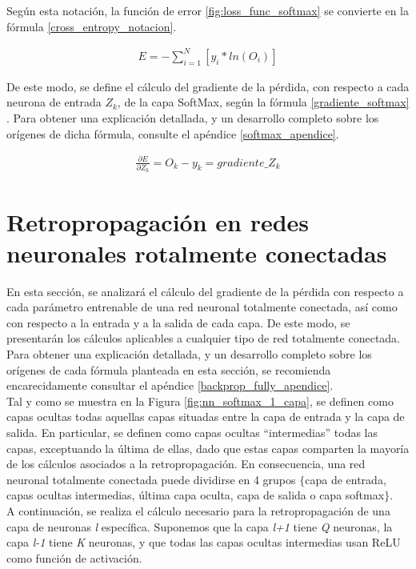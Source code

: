 Según esta notación, la función de error \ref{fig:loss_func_softmax} se convierte en la fórmula \ref{cross_entropy_notacion}.

\begin{gather}
	E = - \sum_{i=1}^{N}  [y_i * ln(O_i)] 
	\label{cross_entropy_notacion}
\end{gather}

De este modo, se define el cálculo del gradiente de la pérdida, con respecto a cada neurona de entrada $Z_k$, de la capa SoftMax, según la fórmula \ref{gradiente_softmax} \cite{Cross_entropy_backprop} \cite{Cross_entropy_backprop_grad_input}. Para obtener una explicación detallada, y un desarrollo completo sobre los orígenes de dicha fórmula, consulte el apéndice \ref{softmax_apendice}.

\begin{gather}
	\frac{\partial E}{\partial Z_k} = O_k - y_k = gradiente\_Z_k
	\label{gradiente_softmax}
\end{gather}


\section{Retropropagación en redes neuronales rotalmente conectadas}

En esta sección, se analizará el cálculo del gradiente de la pérdida con respecto a cada parámetro entrenable de una red neuronal totalmente conectada, así como con respecto a la entrada y a la salida de cada capa. De este modo, se presentarán los cálculos aplicables a cualquier tipo de red totalmente conectada. Para obtener una explicación detallada, y un desarrollo completo sobre los orígenes de cada fórmula planteada en esta sección, se recomienda encarecidamente consultar el apéndice \ref{backprop_fully_apendice}.\\

Tal y como se muestra en la Figura \ref{fig:nn_softmax_1_capa}, se definen como capas ocultas todas aquellas capas situadas entre la capa de entrada y la capa de salida.
En particular, se definen como capas ocultas ``intermedias'' todas las capas, exceptuando la última de ellas, dado que estas capas comparten la mayoría de los cálculos asociados a la retropropagación. En consecuencia, una red neuronal totalmente conectada puede dividirse en 4 grupos $\{$capa de entrada, capas ocultas intermedias, última capa oculta, capa de salida o capa softmax$\}$. \\
A continuación, se realiza el cálculo necesario para la retropropagación de una capa de neuronas \textit{l} específica. Suponemos que la capa \textit{l+1} tiene \textit{Q} neuronas, la capa \textit{l-1} tiene \textit{K} neuronas, y que todas las capas ocultas intermedias usan ReLU como función de activación. \\

